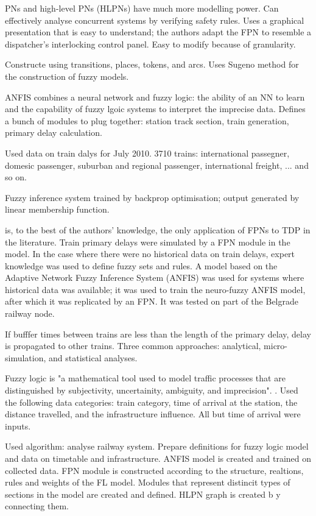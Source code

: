 \documentclass{article}
\begin{document}
PNs and high-level PNs (HLPNs) have much more modelling power. Can effectively analyse concurrent systems by verifying safety rules. Uses a graphical presentation that is easy to understand; the authors adapt the FPN to resemble a dispatcher's interlocking control panel. Easy to modify because of granularity. 

Constructe using transitions, places, tokens, and arcs. Uses Sugeno method for the construction of fuzzy models. 

ANFIS combines a neural network and fuzzy logic: the ability of an NN to learn and the capability of fuzzy lgoic systems to interpret the imprecise data. Defines a bunch of modules to plug together: station track section, train generation, primary delay calculation.

Used data on train dalys for July 2010. 3710 trains: international passegner, domesic passenger, suburban and regional passenger, international freight, ... and so on. 

Fuzzy inference system trained by backprop optimisation; output generated by linear membership function. 

\cite{milinkovic_et_al_2013} is, to the best of the authors' knowledge, the only application of FPNs to TDP in the literature. Train primary delays were simulated by a FPN module in the model. 
In the case where there were no historical data on train delays, expert knowledge was used to define fuzzy sets and rules. A model based on the Adaptive Network Fuzzy Inference System (ANFIS) was used for systems where historical data was available; it was used to train the neuro-fuzzy ANFIS model, after which it was replicated by an FPN. It was tested on part of the Belgrade railway node. 

If bufffer times between trains are less than the length of the primary delay, delay is propagated to other trains. Three common approaches: analytical, micro-simulation, and statistical analyses. 

Fuzzy logic is "a mathematical tool used to model traffic processes that are distinguished by subjectivity, uncertainity, ambiguity, and imprecision". \cite{milinkovic_et_al_2013}. Used the following data categories: train category, time of arrival at the station, the distance travelled, and the infrastructure influence. All but time of arrival were inputs. 

Used algorithm: analyse railway system. Prepare definitions for fuzzy logic model and data on timetable and infrastructure.
ANFIS model is created and trained on collected data. FPN module is constructed according to the structure, realtions, rules and weights of the FL model.
Modules that represent distincit types of sections in the model are created and defined. HLPN graph is created b y connecting them. 
\end{document}
